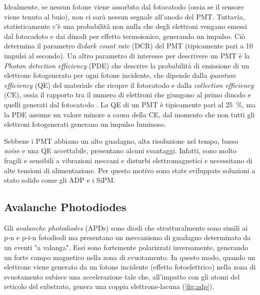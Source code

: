 Idealmente, se nessun fotone viene assorbito dal fotocatodo (ossia se il sensore viene tenuto al buio), non ci sarà nessun segnale all'anodo del PMT. Tuttavia, statisticamente c'è una probabilità non nulla che degli elettroni vengano emessi dal fotocadoto e dai dinodi per effetto termoionico, generando un impulso. Ciò determina il parametro di\textit{dark count rate} (DCR) del PMT (tipicamente pari a 10 impulsi al secondo). 
Un altro parametro di interesse per descrivere un PMT è la \textit{Photon detection efficiency} (PDE) che descrive la probabilità di emissione di un elettrone fotogenerato per ogni fotone incidente, che dipende dalla \textit{quantum efficiency} (QE) del materiale che ricopre il fotocatodo e dalla \textit{collection efficiency} (CE), ossia il rapporto tra il numero di elettroni che giungono al primo dinodo e quelli generati dal fotocatodo \cite{Hai2018}. La QE di un PMT è tipicamente pari al \SI{25}{\percent}, ma la PDE assume un valore minore a causa della CE, dal momento che non tutti gli elettroni fotogenerati generano un impulso luminoso.

Sebbene i PMT abbiano un alto guadagno, alta risoluzione nel tempo, basso \textit{noise} e una QE accettabile, presentano alcuni svantaggi. Infatti, sono molto fragili e sensibili a vibrazioni meccani e disturbi elettromagnetici e necessitano di alte tensioni di alimentazione. Per questo motivo sono state sviluppate soluzioni a stato solido come gli ADP e i SiPM.

\newpage
\subsection{Avalanche Photodiodes}
Gli \textit{avalanche photodiodes} (APDs) sono diodi che strutturalmente sono simili ai p-n e p-i-n fotodiodi ma presentano un meccanismo di guadagno determinato da un eventi "a valanga". Essi sono fortemente polarizzati inversamente, generando un forte campo magnetico nella zona di svuotamento. In questo modo, quando un elettrone viene generato da un fotone incidente (effetto fotoelettrico) nella zona di svuotamento subisce una accelerazione tale che, all'impatto con gli atomi del reticolo del substrato, genera una coppia elettrone-lacuna (\Fig\ref{fig:adp}).  

